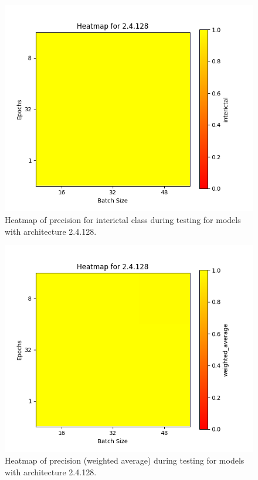 \documentclass[12pt]{article}
\begin{document}
\begin{figure}[H]
\includegraphics[width=\textwidth]{heatmap_precision_interictal_2.4.128}
\centering
\caption{Heatmap of precision for interictal class during testing for models with architecture 2.4.128.}
\label{fig:time-metrics}
\end{figure}

\begin{figure}[H]
\includegraphics[width=\textwidth]{heatmap_precision_weighted_average_2.4.128}
\centering
\caption{Heatmap of precision (weighted average) during testing for models with architecture 2.4.128.}
\label{fig:time-metrics}
\end{figure}
\end{document}

